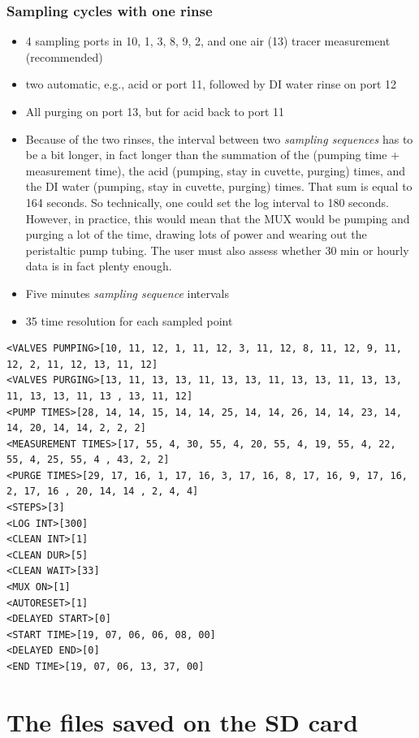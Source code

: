 \documentclass[]{book}
\providecommand{\tightlist}{%
  \setlength{\itemsep}{0pt}\setlength{\parskip}{0pt}}
\begin{document}
\hypertarget{sampling-cycles-with-one-rinse-2}{%
\subsection{Sampling cycles with one rinse}\label{sampling-cycles-with-one-rinse-2}}

\begin{itemize}
\tightlist
\item
  4 sampling ports in 10, 1, 3, 8, 9, 2, and one air (13) tracer measurement (recommended)
\item
  two automatic, e.g., acid or port 11, followed by DI water rinse on port 12
\item
  All purging on port 13, but for acid back to port 11
\item
  Because of the two rinses, the interval between two \emph{sampling sequences} has to be a bit longer, in fact longer than the summation of the (pumping time + measurement time), the acid (pumping, stay in cuvette, purging) times, and the DI water (pumping, stay in cuvette, purging) times. That sum is equal to 164 seconds. So technically, one could set the log interval to 180 seconds. However, in practice, this would mean that the MUX would be pumping and purging a lot of the time, drawing lots of power and wearing out the peristaltic pump tubing. The user must also assess whether 30 min or hourly data is in fact plenty enough.
\item
  Five minutes \emph{sampling sequence} intervals
\item
  35 time resolution for each sampled point
\end{itemize}

\begin{verbatim}
<VALVES PUMPING>[10, 11, 12, 1, 11, 12, 3, 11, 12, 8, 11, 12, 9, 11, 12, 2, 11, 12, 13, 11, 12]
<VALVES PURGING>[13, 11, 13, 13, 11, 13, 13, 11, 13, 13, 11, 13, 13, 11, 13, 13, 11, 13 , 13, 11, 12]
<PUMP TIMES>[28, 14, 14, 15, 14, 14, 25, 14, 14, 26, 14, 14, 23, 14, 14, 20, 14, 14, 2, 2, 2]
<MEASUREMENT TIMES>[17, 55, 4, 30, 55, 4, 20, 55, 4, 19, 55, 4, 22, 55, 4, 25, 55, 4 , 43, 2, 2]
<PURGE TIMES>[29, 17, 16, 1, 17, 16, 3, 17, 16, 8, 17, 16, 9, 17, 16, 2, 17, 16 , 20, 14, 14 , 2, 4, 4]
<STEPS>[3]
<LOG INT>[300]
<CLEAN INT>[1]
<CLEAN DUR>[5]
<CLEAN WAIT>[33]
<MUX ON>[1]
<AUTORESET>[1]
<DELAYED START>[0]
<START TIME>[19, 07, 06, 06, 08, 00]
<DELAYED END>[0]
<END TIME>[19, 07, 06, 13, 37, 00]
\end{verbatim}

\hypertarget{the-files-saved-on-the-sd-card}{%
\chapter{The files saved on the SD card}\label{the-files-saved-on-the-sd-card}}
\end{document}
